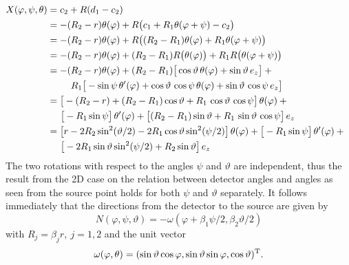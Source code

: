 \documentclass{amsart}
\renewcommand*{\phi}{\varphi}
\begin{document}
\begin{align}
 X(\phi, \psi, \theta)
 &= c_2 + R(d_1 - c_2) \notag \\
 &= -(R_2 - r) \theta(\phi) + R\big(c_1 + R_1 \theta(\phi + \psi) - c_2\big) \notag \\
 &= -(R_2 - r) \theta(\phi) + R\big((R_2-R_1) \theta(\phi) + R_1 \theta(\phi + \psi)\big) \notag \\
 &= -(R_2 - r) \theta(\phi) + (R_2-R_1) R\big(\theta(\phi)\big) + R_1 R\big(\theta(\phi + \psi)\big) \notag \\
 &= -(R_2 - r) \theta(\phi) + (R_2-R_1) \big[ \cos\vartheta\, \theta(\phi) + \sin\vartheta\, e_z \big] + \phantom{x} \notag \\
 &\hspace{25pt} R_1 \big[ -\sin\psi\, \theta'(\phi) + \cos\vartheta\, \cos\psi\, \theta(\phi) + \sin\vartheta\, \cos\psi\, e_z \big] \notag 
 \\
 &= \big[ -(R_2 - r) + (R_2 - R_1) \cos\vartheta + R_1 \, \cos\vartheta\, \cos\psi \big]\, \theta(\phi) + \phantom{x} \notag \\
 &\hspace{14pt} \big[-R_1 \sin\psi\big]\, \theta'(\phi) + \big[ (R_2 - R_1) \sin\vartheta + R_1\, \sin\vartheta\, \cos\psi \big]\, e_z 
\notag  \\
 \label{eq:conecurved_detector_parametr}
 &= \big[ r - 2R_2 \sin^2(\vartheta/2) - 2R_1 \cos\vartheta \sin^2(\psi/2) \big]\, \theta(\phi) + \big[-R_1 \sin\psi\big]\, 
 \theta'(\phi) + \phantom{x} \\
 &\hspace{14pt} \big[ -2R_1 \sin\vartheta\sin^2(\psi/2) + R_2\sin\vartheta \big]\, e_z \notag 
\end{align}
%
%
The two rotations with respect to the angles $\psi$ and $\vartheta$ are independent, thus the result from the 2D case on the relation 
between detector angles and angles as seen from the source point holds for both $\psi$ and $\vartheta$ separately. It follows immediately 
that the directions from the detector to the source are given by
%
\begin{equation}
 \label{eq:conecurved_direction_field}
 N(\phi, \psi, \vartheta) = -\omega(\phi + \beta_1\psi/2, \beta_2\vartheta/2)
\end{equation} 
%
with $R_j = \beta_j r,\ j=1,2$ and the unit vector
%
\begin{equation}
 \label{eq:conecurved_unitvec_omega}
 \omega(\phi, \theta) = \TRANSP{(\sin\vartheta \cos\phi, \sin\vartheta\sin\phi, \cos\vartheta)}.
\end{equation} 
\end{document}
